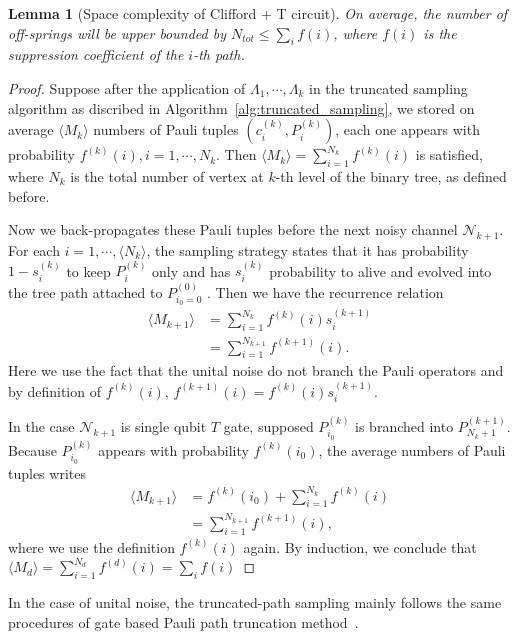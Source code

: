 \documentclass[aps,%
twocolumn,%
floatfix,%
pra,%
amsfonts,%
longbibliography,%
groupedaddress,%
superscriptaddress]{revtex4-2}%
\newtheorem{lemma}{Lemma}
\newcommand{\1}{\mathbbm{1}}
\begin{document}
\begin{lemma}[Space complexity of Clifford + T circuit]
     On average, the number of off-springs will be upper bounded by $ N_{tot} \leq \sum_i f(i)$, where $f(i)$ is the suppression coefficient of the $i$-th path. 
 \end{lemma}
 \begin{proof}

Suppose after the application of $\Lambda_1, \cdots, \Lambda_k$ in the truncated sampling algorithm as discribed in Algorithm~\ref{alg:truncated_sampling}, we stored on average $\langle M_k\rangle $ numbers of Pauli tuples $(c_i^{(k)}, P_i^{(k)})$, each one appears with probability $f^{(k)}(i), i =1,\cdots,N_k$. 
Then $\langle M_k \rangle = \sum_{i = 1}^{N_k}f^{(k)}(i)$ is satisfied, where $N_k$ is the total number of vertex at $k$-th level of the binary tree, as defined before.

Now we back-propagates these Pauli tuples before the next noisy channel $\mathcal{N}_{k+1}$. For each $i = 1, \cdots, \langle N_k\rangle $, the sampling strategy states that it has probability $1 - s_i^{(k)}$ to keep $P_i^{(k)}$ only and has $s_i^{(k)}$ probability to alive and evolved into the tree path attached to  $P_{i_0 = 0}^{(0)}$ . Then we have the recurrence relation 
\begin{align}
    \langle M_{k+1}\rangle &= \sum_{i=1}^{ N_k} f^{(k)}(i) s_i^{(k+1)}\\
    &=\sum_{i=1}^{ N_{k+1}} f^{(k+1)}(i).
\end{align}
Here we use the fact that the unital noise do not branch the Pauli operators and by definition of $f^{(k)}(i)$, $f^{(k+1)}(i) = f^{(k)}(i) s_i^{(k+1)}$.

In the case  $\mathcal{N}_{k+1}$ is single qubit $T$ gate, supposed $P_{i_0}^{(k)}$ is branched into $P_{N_k +1}^{(k+1)}$. Because $P_{i_0}^{(k)}$  appears with probability $f^{(k)}(i_0)$,  the average numbers of Pauli tuples writes
\begin{align}
     \langle M_{k+1}\rangle &=  f^{(k)}(i_0) + \sum_{i=1}^{ N_k} f^{(k)}(i) \\
    &=\sum_{i=1}^{ N_{k+1}} f^{(k+1)}(i),
\end{align}
where we use the definition $f^{(k)}(i)$ again. By induction, we conclude that $\langle M_d \rangle = \sum_{i = 1}^{N_d}f^{(d)}(i) =\sum_i f(i) $
 \end{proof}
In the case of unital noise, the truncated-path sampling mainly follows the same procedures of gate based Pauli path truncation method~\cite{schuster2024polynomial}.
\end{document}
